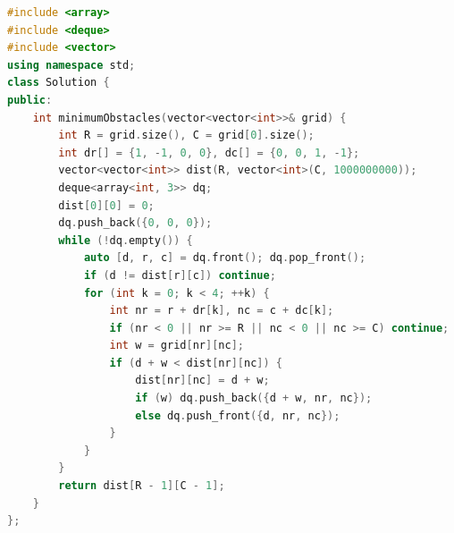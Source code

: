 \documentclass[11pt]{article}
\begin{document}
\begin{lstlisting}[language=C++,caption={P06 --- C++17},label={lst:p06-cpp}]
#include <array>
#include <deque>
#include <vector>
using namespace std;
class Solution {
public:
    int minimumObstacles(vector<vector<int>>& grid) {
        int R = grid.size(), C = grid[0].size();
        int dr[] = {1, -1, 0, 0}, dc[] = {0, 0, 1, -1};
        vector<vector<int>> dist(R, vector<int>(C, 1000000000));
        deque<array<int, 3>> dq;
        dist[0][0] = 0;
        dq.push_back({0, 0, 0});
        while (!dq.empty()) {
            auto [d, r, c] = dq.front(); dq.pop_front();
            if (d != dist[r][c]) continue;
            for (int k = 0; k < 4; ++k) {
                int nr = r + dr[k], nc = c + dc[k];
                if (nr < 0 || nr >= R || nc < 0 || nc >= C) continue;
                int w = grid[nr][nc];
                if (d + w < dist[nr][nc]) {
                    dist[nr][nc] = d + w;
                    if (w) dq.push_back({d + w, nr, nc});
                    else dq.push_front({d, nr, nc});
                }
            }
        }
        return dist[R - 1][C - 1];
    }
};
\end{lstlisting}
\end{document}
